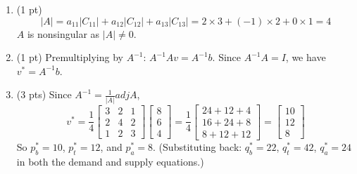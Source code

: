 \documentclass{./../../latex/tests}
\begin{document}
\begin{enumerate}
\begin{enumerate}
\[\begin{aligned}
\begin{array}{rr}
\end{array}\right|=2 \\~\\
&\left|C_{31}\right|=\left|\begin{array}{rr}
-1 & 0 \\
2 & -1
\end{array}\right|=1 \quad \left|C_{32}\right|=-\left|\begin{array}{rr}
2 & 0 \\
-1 & -1
\end{array}\right|=2 \quad \left|C_{33}\right|=\left|\begin{array}{rr}
2 & -1 \\
-1 & 2
\end{array}\right|=3 \\~\\
&adj A = C^T =\left[\begin{array}{lll}
3 & 2 & 1 \\
2 & 4 & 2 \\
1 & 2 & 3
\end{array}\right]
\end{aligned}
\]
\item (1 pt)
\[ |A| = a_{11}\left|C_{11}\right|+a_{12}\left|C_{12}\right|+a_{13}\left|C_{13}\right| = 2 \times 3 + (-1) \times 2 + 0 \times 1 = 4 \]
$A$ is nonsingular as $|A| \neq 0$.
\item (1 pt) Premultiplying by $A^{-1}$: $A^{-1} A v = A^{-1} b$. Since $A^{-1} A = I$, we have $v^* = A^{-1} b$.
\item (3 pts) Since $A^{-1}=\frac{1}{|A|} adj A$,
\[
v^{*} =\frac{1}{4}\left[\begin{array}{lll}
3 & 2 & 1 \\
2 & 4 & 2 \\
1 & 2 & 3
\end{array}\right]\left[\begin{array}{c}
8 \\
6 \\
4
\end{array}\right]
=\frac{1}{4}\left[\begin{array}{c}
24+12+4 \\
16+24+8 \\
8+12+12
\end{array}\right]=\left[\begin{array}{c}
10 \\
12 \\
8
\end{array}\right]
\]
So $p_b^* = 10$, $p_t^* = 12$, and $p_a^* = 8$. (Substituting back: $q_b^* = 22$, $q_t^* = 42$, $q_a^* = 24$ in both the demand and supply equations.)
\end{enumerate}

\end{enumerate}
\end{document}
